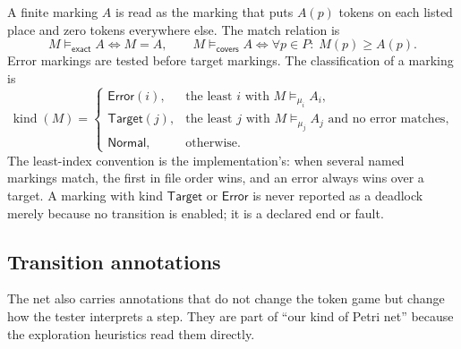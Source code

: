 \documentclass[11pt,a4paper]{article}
\newcommand{\kind}{\operatorname{kind}}
\begin{document}
A finite marking $A$ is read as the marking that puts $A(p)$ tokens on each
listed place and zero tokens everywhere else.  The match relation is
\[
  M\models_{\mathsf{exact}} A \iff M=A,
  \qquad
  M\models_{\mathsf{covers}} A \iff \forall p\in P:\; M(p)\ge A(p).
\]
Error markings are tested before target markings.  The classification of a
marking is
\[
  \kind(M)=
  \begin{cases}
    \mathsf{Error}(i), & \text{the least }i\text{ with }M\models_{\mu_i} A_i,\\
    \mathsf{Target}(j), & \text{the least }j\text{ with }M\models_{\mu_j} A_j
                         \text{ and no error matches},\\
    \mathsf{Normal}, & \text{otherwise}.
  \end{cases}
\]
The least-index convention is the implementation's: when several named
markings match, the first in file order wins, and an error always wins over a
target.  A marking with kind $\mathsf{Target}$ or $\mathsf{Error}$ is never
reported as a deadlock merely because no transition is enabled; it is a
declared end or fault.

\subsection{Transition annotations}\label{sec:annotations}

The net also carries annotations that do not change the token game but change
how the tester interprets a step.  They are part of ``our kind of Petri net''
because the exploration heuristics read them directly.
\end{document}
